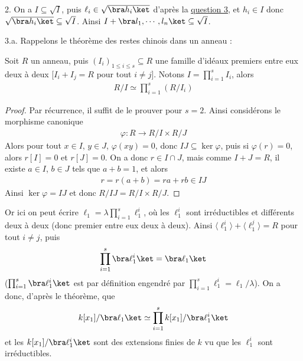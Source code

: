 \documentclass[11pt]{article}
\begin{document}
    \begin{question}{2.}
        \label{q22}
        On a $I \subseteq \sqrt{I}$, puis $\ell_i \in \sqrt{\bra h_i \ket}$ d'après la \hyperref[q3]{question 3}, et $h_i \in I$ donc $\sqrt{\bra h_i \ket} \subseteq \sqrt{I}$. Ainsi $I + \bra l_1, \cdots, l_n \ket \subseteq \sqrt{I}$.
    \end{question}
    \begin{question}{3.a.}
        \label{q3a}
        Rappelons le théorème des restes chinois dans un anneau :
        \begin{theo}
            \label{theo21}
            Soit $R$ un anneau, puis $(I_i)_{1 \leq i \leq s} \subseteq R$ une famille d'idéaux premiers entre eux deux à deux [$I_i + I_j = R$ pour tout $i \neq j$]. Notons $I = \prod_{i = 1}^s I_i$, alors
            \begin{align*}
                R/I \simeq \prod_{i = 1}^s (R/I_i)
            \end{align*}
        \end{theo}
        \begin{proof}
            Par récurrence, il suffit de le prouver pour $s = 2$. Ainsi considérons le morphisme canonique
            \begin{align*}
                \varphi : R \to R/I \times R/J
            \end{align*}
            Alors pour tout $x \in I$, $y \in J$, $\varphi(xy) = 0$, donc $IJ \subseteq \ker \varphi$, puis si $\varphi(r) = 0$, alors $r[I] = 0$ et $r[J] = 0$. On a donc $r \in I \cap J$, mais comme $I + J = R$, il existe $a \in I$, $b \in J$ tels que $a + b = 1$, et alors
            \begin{align*}
                r = r(a + b) = ra + rb \in IJ
            \end{align*}
            Ainsi $\ker \varphi = IJ$ et donc $R/IJ = R/I \times R/J$.
        \end{proof}
        Or ici on peut écrire $\ell_1 = \lambda \prod_{i = 1}^s \ell_1^i$, où les $\ell_1^i$ sont irréductibles et différents deux à deux (donc premier entre eux deux à deux). Ainsi $\langle \ell_1^i \rangle + \langle \ell_1^j \rangle = R$ pour tout $i \neq j$, puis
        \begin{align*}
            \prod_{i = 1}^s \bra \ell_1^i \ket = \bra \ell_1 \ket
        \end{align*}
        ($\prod_{i = 1}^s \bra \ell_1^i \ket$ est par définition engendré par $\prod_{i = 1}^s \ell_1^i = \ell_1/\lambda$). On a donc, d'après le théorème, que
        \begin{align*}
            k[x_1]/\bra \ell_1 \ket \simeq \prod_{i = 1}^s k[x_1]/\bra \ell_1^i \ket
        \end{align*}
        et les $k[x_1]/\bra \ell_1^i \ket$ sont des extensions finies de $k$ vu que les $\ell_1^i$ sont irréductibles.
    \end{question}
\end{document}
